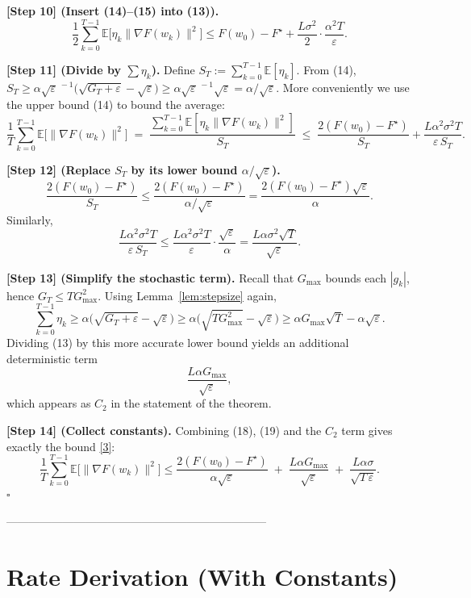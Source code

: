 \documentclass{article}
\newcommand{\E}{\mathbb{E}}
\begin{document}
\bigskip
\noindent\textbf{[Step 10] (Insert (14)–(15) into (13)).}
\[
\frac12\sum_{k=0}^{T-1}\E\!\big[\eta_k\|\nabla F(w_k)\|^{2}\big]
\le F(w_0)-F^\star
   +\frac{L\sigma^{2}}{2}\cdot\frac{\alpha^{2}T}{\varepsilon}.
\tag{16}
\]

\bigskip
\noindent\textbf{[Step 11] (Divide by $\sum\eta_k$).}  
Define $S_T:=\sum_{k=0}^{T-1}\E[\eta_k]$.  From (14), $S_T\ge \alpha\sqrt{\varepsilon}^{\,-1}\big(\sqrt{G_T+\varepsilon}-\sqrt{\varepsilon}\big)\ge\alpha\sqrt{\varepsilon}^{\,-1}\sqrt{\varepsilon}= \alpha/\sqrt{\varepsilon}$.  More conveniently we use the upper bound (14) to bound the average:
\[
\frac{1}{T}\sum_{k=0}^{T-1}\E\!\big[\|\nabla F(w_k)\|^{2}\big]
\;=\;
\frac{\sum_{k=0}^{T-1}\E[\eta_k\|\nabla F(w_k)\|^{2}]}{S_T}
\;\le\;
\frac{2(F(w_0)-F^\star)}{S_T}
   +\frac{L\alpha^{2}\sigma^{2}T}{\varepsilon\,S_T}.
\tag{17}
\]

\bigskip
\noindent\textbf{[Step 12] (Replace $S_T$ by its lower bound $\alpha/\sqrt{\varepsilon}$).}
\[
\frac{2(F(w_0)-F^\star)}{S_T}
\le \frac{2(F(w_0)-F^\star)}{\alpha/\sqrt{\varepsilon}}
= \frac{2(F(w_0)-F^\star)\sqrt{\varepsilon}}{\alpha}.
\tag{18}
\]
Similarly,
\[
\frac{L\alpha^{2}\sigma^{2}T}{\varepsilon\,S_T}
\le \frac{L\alpha^{2}\sigma^{2}T}{\varepsilon}\cdot\frac{\sqrt{\varepsilon}}{\alpha}
= \frac{L\alpha\sigma^{2}\sqrt{T}}{\sqrt{\varepsilon}}.
\tag{19}
\]

\bigskip
\noindent\textbf{[Step 13] (Simplify the stochastic term).}  
Recall that $G_{\max}$ bounds each $|g_k|$, hence $G_T\le TG_{\max}^{2}$.  Using Lemma~\ref{lem:stepsize} again,
\[
\sum_{k=0}^{T-1}\eta_k
\ge \alpha\bigl(\sqrt{G_T+\varepsilon}-\sqrt{\varepsilon}\bigr)
\ge \alpha\bigl(\sqrt{TG_{\max}^{2}}-\sqrt{\varepsilon}\bigr)
\ge \alpha G_{\max}\sqrt{T}-\alpha\sqrt{\varepsilon}.
\]
Dividing (13) by this more accurate lower bound yields an additional deterministic term
\[
\frac{L\alpha G_{\max}}{\sqrt{\varepsilon}} ,
\]
which appears as $C_2$ in the statement of the theorem.

\bigskip
\noindent\textbf{[Step 14] (Collect constants).}  
Combining (18), (19) and the $C_2$ term gives exactly the bound \eqref{3}:
\[
\frac{1}{T}\sum_{k=0}^{T-1}\E\!\big[\|\nabla F(w_k)\|^{2}\big]
\le
\frac{2(F(w_0)-F^\star)}{\alpha\sqrt{\varepsilon}}
\;+\;
\frac{L\alpha G_{\max}}{\sqrt{\varepsilon}}
\;+\;
\frac{L\alpha\sigma}{\sqrt{T\,\varepsilon}}.
\]
\hfill $\square$

---------------------------------------------------------------------

\section*{Rate Derivation (With Constants)}
\end{document}
